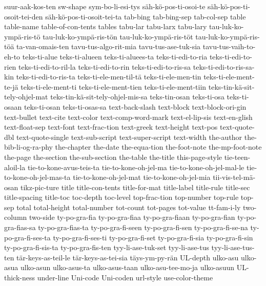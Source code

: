 {  suur-aak-kos-ten
  sw-shape
  sym-bo-li-esi-tys
  säh-kö-pos-ti-osoi-te
  säh-kö-pos-ti-osoit-tei-den
  säh-kö-pos-ti-osoit-tei-ta
  tab-bing
  tab-bing-sep
  tab-col-sep
  table
  table-name
  table-of-con-tents
  tables
  tabu-lar
  tabu-larx
  tabu-lary
  tau-luk-ko-ympä-ris-tö
  tau-luk-ko-ympä-ris-tön
  tau-luk-ko-ympä-ris-töt
  tau-luk-ko-ympä-ris-töä
  ta-van-omais-ten
  tavu-tus-algo-rit-mia
  tavu-tus-ase-tuk-sia
  tavu-tus-vaih-to-eh-to
  teks-ti-alue
  teks-ti-alueen
  teks-ti-aluees-ta
  teks-ti-edi-to-ria
  teks-ti-edi-to-rien
  teks-ti-edi-to-ril-la
  teks-ti-edi-to-rin
  teks-ti-edi-to-ris-sa
  teks-ti-edi-to-ris-sa-kin
  teks-ti-edi-to-ris-ta
  teks-ti-ele-men-til-tä
  teks-ti-ele-men-tin
  teks-ti-ele-ment-te-jä
  teks-ti-ele-ment-ti
  teks-ti-ele-ment-tien
  teks-ti-ele-ment-tiin
  teks-tin-kä-sit-tely-ohjel-mat
  teks-tin-kä-sit-tely-ohjel-mis-sa
  teks-tin-osan
  teks-ti-osa
  teks-ti-osaan
  teks-ti-osan
  teks-ti-osas-sa
  text-back-slash
  text-block
  text-block-ori-gin
  text-bullet
  text-cite
  text-color
  text-comp-word-mark
  text-el-lip-sis
  text-en-glish
  text-float-sep
  text-font
  text-frac-tion
  text-greek
  text-height
  text-pos
  text-quote-dbl
  text-quote-single
  text-sub-script
  text-super-script
  text-width
  the-author
  the-bib-li-og-ra-phy
  the-chapter
  the-date
  the-equa-tion
  the-foot-note
  the-mp-foot-note
  the-page
  the-section
  the-sub-section
  the-table
  the-title
  this-page-style
  tie-teen-aloil-la
  tie-to-kone-avus-teis-ta
  tie-to-kone-oh-jel-ma
  tie-to-kone-oh-jel-mal-le
  tie-to-kone-oh-jel-mas-ta
  tie-to-kone-oh-jel-mat
  tie-to-kone-oh-jel-mia
  tii-vis-tel-mä-osan
  tikz-pic-ture
  title
  title-con-tents
  title-for-mat
  title-label
  title-rule
  title-sec
  title-spacing
  title-toc
  toc-depth
  toc-level
  top-frac-tion
  top-number
  top-rule
  top-sep
  total
  total-height
  total-number
  tot-count
  tot-pages
  tot-value
  tt-fam-i-ly
  two-column
  two-side
  ty-po-gra-fia
  ty-po-gra-fiaa
  ty-po-gra-fiaan
  ty-po-gra-fian
  ty-po-gra-fias-sa
  ty-po-gra-fias-ta
  ty-po-gra-fi-seen
  ty-po-gra-fi-sen
  ty-po-gra-fi-se-na
  ty-po-gra-fi-ses-ta
  ty-po-gra-fi-ses-ti
  ty-po-gra-fi-set
  ty-po-gra-fi-sia
  ty-po-gra-fi-sin
  ty-po-gra-fi-sis-ta
  ty-po-gra-fis-ten
  tyy-li-ase-tuk-set
  tyy-li-ase-tus
  tyy-li-ase-tus-ten
  tär-keys-as-teil-le
  tär-keys-as-tei-sia
  täys-ym-py-rän
  UL-depth
  ulko-asu
  ulko-asua
  ulko-asun
  ulko-asus-ta
  ulko-asus-taan
  ulko-asu-tee-mo-ja
  ulko-asuun
  UL-thick-ness
  under-line
  Uni-code
  Uni-coden
  url-style
  use-color-theme
}
